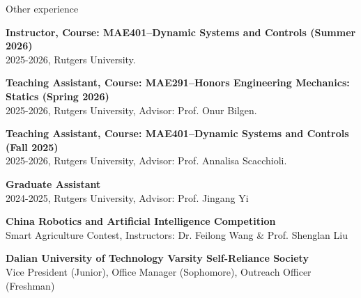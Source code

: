 \documentclass{resume} %
\begin{document}
\begin{rSection}{Other experience}

\begin{rSubsection}{}{}
	{}{}
\item {{\bf Instructor, Course: MAE401–Dynamic Systems and Controls (Summer 2026)}\\ 2025-2026, Rutgers University.}\\

\item {{\bf Teaching Assistant, Course: MAE291–Honors Engineering Mechanics: Statics (Spring 2026)}\\ 2025-2026, Rutgers University, Advisor: Prof. Onur Bilgen.}\\

\item {{\bf Teaching Assistant, Course: MAE401–Dynamic Systems and Controls (Fall 2025)}\\ 2025-2026, Rutgers University, Advisor: Prof. Annalisa Scacchioli.}\\

\item {{\bf Graduate Assistant}\\ 2024-2025, Rutgers University, Advisor: Prof. Jingang Yi}\\

\item {{\bf China Robotics and Artificial Intelligence Competition}\\ Smart Agriculture Contest, Instructors: Dr. Feilong Wang \& Prof. Shenglan Liu}\\


\item {{\bf Dalian University of Technology Varsity Self-Reliance Society}\\Vice President (Junior), Office Manager (Sophomore), Outreach Officer (Freshman)}\\
\end{rSubsection}

\end{rSection}

\end{document}
